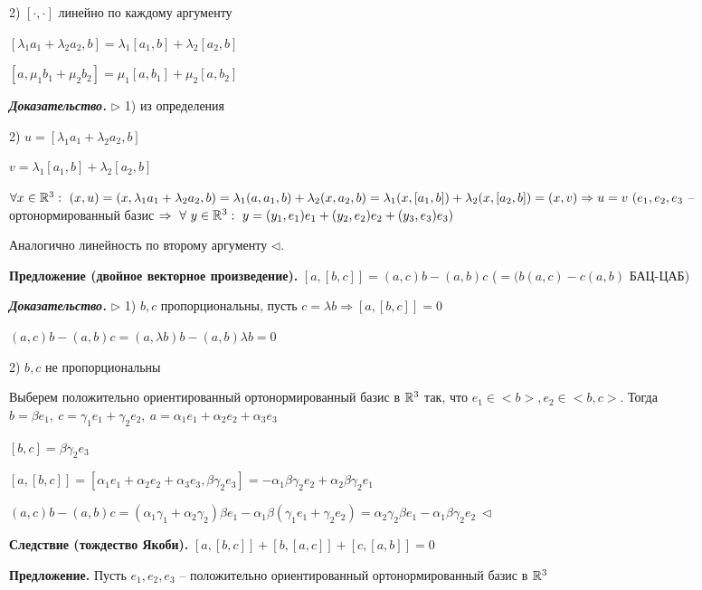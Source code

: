 2) $[\cdot, \cdot]$ линейно по каждому аргументу

$[\lambda_1 a_1 + \lambda_2 a_2, b] = \lambda_1 [a_1, b] + \lambda_2 [a_2, b]$

$[a, \mu_1 b_1 + \mu_2 b_2] = \mu_1 [a, b_1] + \mu_2 [a, b_2]$

\bigskip
\textbf{\textit{Доказательство.}} $\rhd$ 1) из определения

2) $u = [\lambda_1 a_1 + \lambda_2 a_2, b]$

$v = \lambda_1 [a_1, b] + \lambda_2 [a_2, b]$

$\forall x \in \mathbb{R}^3 : \ (x, u) = (x, \lambda_1 a_1 + \lambda_2 a_2, b) = \lambda_1 (a, a_1, b) + \lambda_2 (x, a_2, b) = \lambda_1 (x, [a_1, b]) + \lambda_2 (x, [a_2, b]) = (x, v) \Rightarrow u = v \ (e_1, e_2, e_3$ -- ортонормированный базис $\Rightarrow \ \forall \ y \in \mathbb{R}^3 : \ y = (y_1, e_1) e_1 + (y_2, e_2) e_2 + (y_3, e_3) e_3)$

Аналогично линейность по второму аргументу $\lhd$.

\bigskip
\textbf{Предложение (двойное векторное произведение).} $[a, [b, c]] = (a, c) b - (a, b) c$ ($= (b (a, c) - c (a, b)$ БАЦ-ЦАБ)

\bigskip
\textbf{\textit{Доказательство.}} $\rhd$ 1) $b, c$ пропорциональны, пусть $c = \lambda b \Rightarrow [a, [b, c]] = 0$

$(a, c)b - (a, b) c = (a, \lambda b)b - (a, b) \lambda b = 0$

2) $b, c$ не пропорциональны

Выберем положительно ориентированный ортонормированный базис в $\mathbb{R}^3$ так, что $e_1 \in <b>, e_2 \in <b, c>$. Тогда $b = \beta e_1, \ c = \gamma_1 e_1 + \gamma_2 e_2, \ a = \alpha_1 e_1 + \alpha_2 e_2 + \alpha_3 e_3$

$[b, c] = \beta \gamma_2 e_3$

$[a, [b, c]] = [\alpha_1 e_1 + \alpha_2 e_2 + \alpha_3 e_3, \beta \gamma_2 e_3] = -\alpha_1 \beta \gamma_2 e_2 + \alpha_2 \beta \gamma_2 e_1$

$(a, c) b - (a, b) c = (\alpha_1 \gamma_1 + \alpha_2 \gamma_2) \beta e_1 - \alpha_1 \beta (\gamma_1 e_1 + \gamma_2 e_2) = \alpha_2 \gamma_2 \beta e_1 - \alpha_1 \beta \gamma_2 e_2 \ \lhd$

\bigskip
\textbf{Следствие (тождество Якоби).} $[a, [b, c]] + [b, [a, c]] + [c, [a, b]] = 0$

\bigskip
\textbf{Предложение.} Пусть $e_1, e_2, e_3$ -- положительно ориентированный ортонормированный базис в $\mathbb{R}^3$


